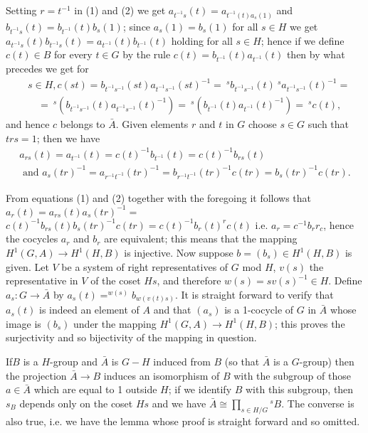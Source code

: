 Setting $r=t^{-1}$ in (1) and (2) we get
$a_{t^{-1}s}(t)=a_{t^{-1}(t)a_s(1)}$ and
$b_{t^{-1}s}(t)=b_{t^{-1}}(t)b_s(1)$; since $a_s(1)=b_s(1)$ for all
$s\in H$ we get
$a_{t^{-1}s}(t)b_{t^{-1}s}(t)=a_{t^{-1}}(t)b_{t^{-1}}(t)$ holding for
all $s\in H$; hence if we define $c(t)\in  B$ for every $t\in G$ by
the rule $c(t)=b_{t^{-1}}(t)a_{t^{-1}}(t)$ then by what precedes we
get for 
\begin{align*}
& s \in H, c(st)  = b_{t^{-1} s^{-1}} (st) a_{t^{-1}s^{-1}} (st)^{-1} = 
~^{s} b_{t^{-1}s^{-1}} (t) ~^{s} a_{t^{-1} s^{-1}} (t)^{-1} =\\
& \quad = ~^{s} (b_{t^{-1} s^{-1}}(t)a_{t^{-1}s^{-1}} (t)^{-1}) =
~^{s} (b_{t^{-1}}(t) a_{t^{-1}} (t)^{-1}) = ~^{s}c(t), 
\end{align*}\pageoriginale
 and hence $c$ belongs to $\bar{A}$. Given elements $r$ and $t$ in $G$
 choose $s \in G$ such that $trs = 1$; then we have
\begin{gather*}
a_{rs}(t) = a_{t^{-1}}(t) = c(t)^{-1}b_{t^{-1}}(t) = c(t)^{-1}b_{rs}(t)\\
\text{ and } a_s(tr)^{-1} = a_{r^{-1}t^{-1}}(tr)^{-1} =
b_{r^{-1}t^{-1}} (tr)^{-1} c(tr) = b_s(tr)^{-1}c(tr).
\end{gather*}

From equations (1) and (2) together with the
 foregoing it follows that $a_r(t) = a_{rs}(t)a_s(tr)^{-1} =$
 $c(t)^{-1}b_{rs}(t)b_s(tr)^{-1}c(tr) = c(t)^{-1}b_r(t)^r c(t)$
 i.e. $a_r = c^{-1}b_r r_c$, hence the cocycles $a_r$ and $b_r$ are
 equivalent; this means that the mapping $H^1(G,A) \rightarrow
 H^1(H,B)$ is injective. Now suppose $b = (b_s) \in H^1(H,B)$ is
 given. Let $V$ be a system of right representatives of $G$ 
 mod $H$, $v(s)$ the representative in $V$ of the coset $Hs$, and
 therefore $w(s) = sv(s)^{-1} \in H$. Define $a_s : G \rightarrow
 \bar{A}$ by $a_s(t) = ^{w(s)}b_{w(v(t)s)}$. It is straight forward to
 verify that $a_s(t)$ is indeed an element of $A$ and that $(a_s)$ is
 a 1-cocycle of $G$ in $\bar{A}$ whose image is $(b_s)$ under the
 mapping $H^1(G,A) \rightarrow H^1(H,B)$; this proves the surjectivity
 and so bijectivity of the mapping in question. 

\begin{remark*}
 If\pageoriginale $B$ is a $H$-group and $\bar{A}$ is $G-H$ induced
  from $B$ (so that $\bar{A}$ is a $G$-group) then the projection
  $\bar{A}\rightarrow B$ induces an isomorphism of $B$ with the
  subgroup of those $a\in \bar{A}$ which are equal to 1 outside $H$;
  if we identify $B$ with this subgroup, then $s_B$ depends only on
  the coset $Hs$ and we have $\bar{A}\cong \prod\limits_{s\in H/G}
 {}^s B$. The converse is also true, i.e. we have the lemma whose proof
  is straight forward and so omitted. 
\end{remark*}

